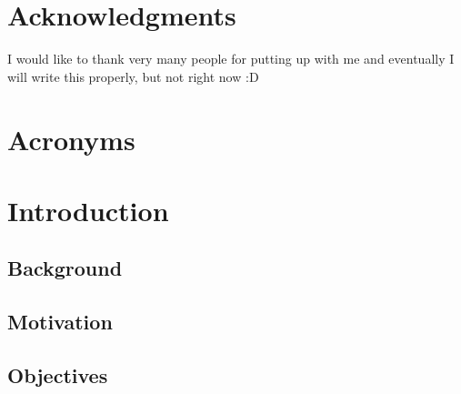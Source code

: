 \documentclass[titlepage,12pt,a4paper,times]{book}
\begin{document}


\clearpage{\thispagestyle{empty}\cleardoublepage}

\frontmatter
\chapter*{Acknowledgments}
\label{chap:ack}

I would like to thank very many people for putting up with me and eventually I
will write this properly, but not right now :D

\tableofcontents

\clearpage{\thispagestyle{empty}\cleardoublepage}

\listoffigures

\clearpage{\thispagestyle{empty}\cleardoublepage}

\listoftables
\clearpage{\thispagestyle{empty}\cleardoublepage}


\chapter*{Acronyms}
\begin{acronym}[SIFT]
\end{acronym}

% 

\clearpage{\thispagestyle{empty}\cleardoublepage}

\mainmatter
\chapter{Introduction}
\label{chap:intro}
\nocite{*}
\section{Background}
\label{sec:amb}

\section{Motivation}
\label{sec:mot}
\section{Objectives}
\label{sec:obj}
\end{document}
